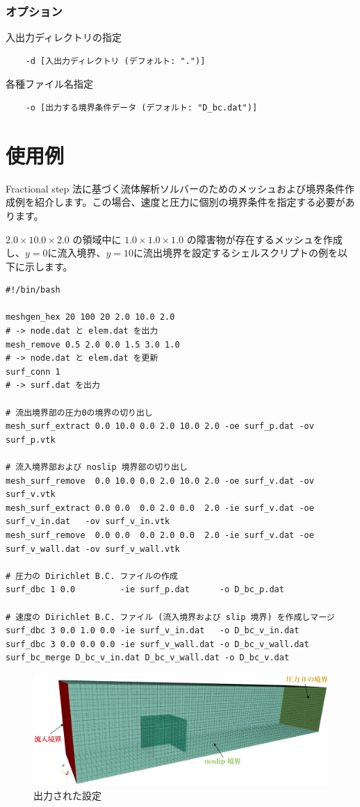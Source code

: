 \documentclass[8pt,a4paper]{article}
\begin{document}
\subsubsection*{オプション}
入出力ディレクトリの指定
\begin{verbatim}
    -d [入出力ディレクトリ (デフォルト: ".")]
\end{verbatim}
各種ファイル名指定
\begin{verbatim}
    -o [出力する境界条件データ (デフォルト: "D_bc.dat")]
\end{verbatim}

\section{使用例}
Fractional step 法に基づく流体解析ソルバーのためのメッシュおよび境界条件作成例を紹介します。この場合、速度と圧力に個別の境界条件を指定する必要があります。

$2.0 \times 10.0 \times 2.0$ の領域中に $1.0 \times 1.0 \times 1.0$ の障害物が存在するメッシュを作成し、$y=0$に流入境界、$y=10$に流出境界を設定するシェルスクリプトの例を以下に示します。

\begin{lstlisting}[]
#!/bin/bash

meshgen_hex 20 100 20 2.0 10.0 2.0
# -> node.dat と elem.dat を出力
mesh_remove 0.5 2.0 0.0 1.5 3.0 1.0
# -> node.dat と elem.dat を更新
surf_conn 1
# -> surf.dat を出力

# 流出境界部の圧力0の境界の切り出し
mesh_surf_extract 0.0 10.0 0.0 2.0 10.0 2.0 -oe surf_p.dat -ov surf_p.vtk

# 流入境界部および noslip 境界部の切り出し
mesh_surf_remove  0.0 10.0 0.0 2.0 10.0 2.0 -oe surf_v.dat -ov surf_v.vtk
mesh_surf_extract 0.0 0.0  0.0 2.0 0.0  2.0 -ie surf_v.dat -oe surf_v_in.dat   -ov surf_v_in.vtk
mesh_surf_remove  0.0 0.0  0.0 2.0 0.0  2.0 -ie surf_v.dat -oe surf_v_wall.dat -ov surf_v_wall.vtk

# 圧力の Dirichlet B.C. ファイルの作成
surf_dbc 1 0.0         -ie surf_p.dat      -o D_bc_p.dat

# 速度の Dirichlet B.C. ファイル (流入境界および slip 境界) を作成しマージ
surf_dbc 3 0.0 1.0 0.0 -ie surf_v_in.dat   -o D_bc_v_in.dat
surf_dbc 3 0.0 0.0 0.0 -ie surf_v_wall.dat -o D_bc_v_wall.dat
surf_bc_merge D_bc_v_in.dat D_bc_v_wall.dat -o D_bc_v.dat
\end{lstlisting}

\begin{figure}[htbp]
	\centering
	\includegraphics[width=17.2truecm]{pics/sample.pdf}
	\caption{出力された設定}
	\label{fig:schema_gcb}
\end{figure}
\end{document}
